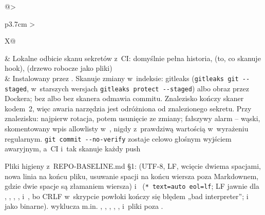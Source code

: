\begin{xltabular}{\linewidth}{@{}>{\raggedright\arraybackslash}p{3.7cm} >{\raggedright\arraybackslash}X@{}}
 & Lokalne odbicie skanu sekretów z~CI: domyślnie pełna historia,  (to, co skanuje hook),  (drzewo robocze jako pliki) \\
 & Instalowany przez . Skanuje zmiany w~indeksie: gitleaks (\texttt{gitleaks git -{}-staged}, w~starszych wersjach \texttt{gitleaks protect -{}-staged}) albo obraz  przez Dockera; bez  albo bez skanera odmawia commitu. Znalezisko kończy skaner kodem~2, więc awaria narzędzia jest odróżniona od znalezionego sekretu. Przy znalezisku: najpierw rotacja, potem usunięcie ze zmiany; fałszywy alarm -- wąski, skomentowany wpis allowlisty w~, nigdy z~prawdziwą wartością w~wyrażeniu regularnym. \texttt{git commit -{}-no-verify} zostaje celowo głośnym wyjściem awaryjnym, a~CI i~tak skanuje każdy push \\
\bottomrule
\end{xltabular}

Pliki higieny z~REPO-BASELINE.md §1:  (UTF-8, LF, wcięcie dwiema
spacjami, nowa linia na końcu pliku, usuwanie spacji na końcu wiersza poza Markdownem, gdzie
dwie spacje są złamaniem wiersza) i~ (\texttt{* text=auto eol=lf}; LF
jawnie dla , , , , 
i~, bo CRLF w~skrypcie powłoki kończy się błędem „bad interpreter”;
 i~ jako binarne).  wyklucza m.in.
, , , ,
,  i~pliki  poza .


